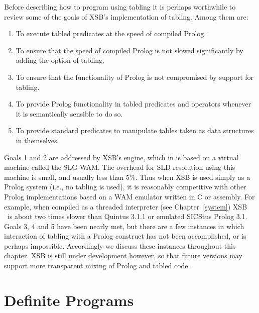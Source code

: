 Before describing how to program using tabling it is perhaps
worthwhile to review some of the goals of XSB's implementation of
tabling.  Among them are:
\begin{enumerate}
\item	To execute tabled predicates at the speed of compiled Prolog.
\item	To ensure that the speed of compiled Prolog is not slowed
	significantly by adding the option of tabling.
\item	To ensure that the functionality of Prolog is not compromised
 	by support for tabling.
\item   To provide Prolog functionality in tabled predicates and
	operators whenever it is semantically sensible to do so.
\item	To provide standard predicates to manipulate tables
	taken as data structures in themselves.
\end{enumerate}

Goals 1 and 2 are addressed by XSB's engine, which in \version{} is
based on a virtual machine called the SLG-WAM\@.  The overhead for SLD
resolution using this machine is small, and usually less than 5\%.
Thus when XSB is used simply as a Prolog system (i.e., no tabling is
used), it is reasonably competitive with other Prolog implementations
based on a WAM emulator written in C or assembly.  For example, when
compiled as a threaded interpreter (see Chapter~\ref{system}) XSB
\version\ is about two times slower than Quintus 3.1.1 or emulated
SICStus Prolog 3.1.
%
Goals 3, 4 and 5 have been nearly met, but there are a few instances
in which interaction of tabling with a Prolog construct has not been
accomplished, or is perhaps impossible.  Accordingly we discuss these
instances throughout this chapter.  XSB is still under development
however, so that future versions may support more transparent mixing
of Prolog and tabled code.

\section{Definite Programs}
\label{sec:def}

